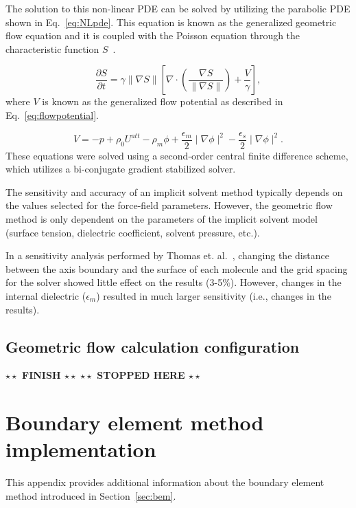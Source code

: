 \documentclass[12pt,titlepage]{article}
\newcommand{\todo}[1]{\textbf{$\star \star$ {#1} $\star \star$}}
\begin{document}
The solution to this non-linear PDE can be solved by utilizing the parabolic PDE shown in Eq.~\ref{eq:NLpde}. This equation is known as the generalized geometric flow equation and it is coupled with the Poisson equation through the characteristic function $S$~\cite{Chen2010}.

\begin{equation}\label{eq:NLpde}
\frac{\partial S}{\partial t}=\gamma\parallel\nabla S\parallel\left[\nabla\cdot\left(\frac{\nabla S}{\parallel\nabla S\parallel}\right)+\frac{V}{\gamma}\right],
\end{equation}
where $V$ is known as the generalized flow potential as described in Eq.~\ref{eq:flowpotential}. 

\begin{equation}\label{eq:flowpotential}
V=-p+\rho_0U^{att}-\rho_m\phi+\frac{\epsilon_m}{2}\mid\nabla\phi\mid^2-\frac{\epsilon_s}{2}\mid\nabla\phi\mid^2.
\end{equation}
%
These equations were solved using a second-order central finite difference scheme, which utilizes a bi-conjugate gradient stabilized solver.

The sensitivity and accuracy of an implicit solvent method typically depends on the values selected for the force-field parameters. However, the geometric flow method is only dependent on the parameters of the implicit solvent model (surface tension, dielectric coefficient, solvent pressure, etc.).

In a sensitivity analysis performed by Thomas et. al.~\cite{Thomas2013}, changing the distance between the axis boundary and the surface of each molecule and the grid spacing for the solver showed little effect on the results (3-5$\%$). However, changes in the internal dielectric ($\epsilon_m$) resulted in much larger sensitivity (i.e., changes in the results).

\subsection{Geometric flow calculation configuration}
\todo{FINISH}
\todo{STOPPED HERE}

\section{Boundary element method implementation} \label{app:bem}
This appendix provides additional information about the boundary element method introduced in Section~\ref{sec:bem}.
\end{document}
